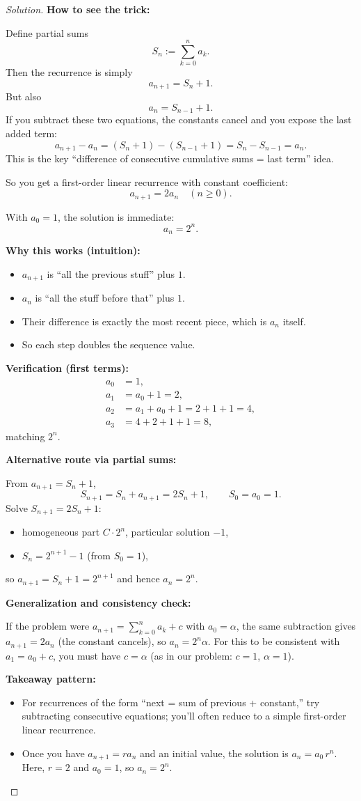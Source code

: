 \documentclass[12pt,a4paper]{article}
\theoremstyle{definition}
\theoremstyle{remark}
\newenvironment{solution}{\begin{proof}[Solution]}{\end{proof}}
\begin{document}
\begin{solution}
\textbf{How to see the trick:}

Define partial sums
$$S_n:=\sum_{k=0}^n a_k.$$
Then the recurrence is simply
$$a_{n+1}=S_n+1.$$
But also
$$a_n=S_{n-1}+1.$$
If you subtract these two equations, the constants cancel and you expose the last added term:
$$a_{n+1}-a_n=(S_n+1)-(S_{n-1}+1)=S_n-S_{n-1}=a_n.$$
This is the key ``difference of consecutive cumulative sums = last term'' idea.

So you get a first-order linear recurrence with constant coefficient:
$$a_{n+1}=2a_n \quad (n\ge 0).$$

With $a_0=1$, the solution is immediate:
$$a_n=2^n.$$

\textbf{Why this works (intuition):}
\begin{itemize}
    \item $a_{n+1}$ is ``all the previous stuff'' plus $1$.
    \item $a_n$ is ``all the stuff before that'' plus $1$.
    \item Their difference is exactly the most recent piece, which is $a_n$ itself.
    \item So each step doubles the sequence value.
\end{itemize}

\textbf{Verification (first terms):}
\begin{align}
a_0 &= 1,\\
a_1 &= a_0+1=2,\\
a_2 &= a_1+a_0+1=2+1+1=4,\\
a_3 &= 4+2+1+1=8,
\end{align}
matching $2^n$.

\textbf{Alternative route via partial sums:}

From $a_{n+1}=S_n+1$,
$$S_{n+1}=S_n+a_{n+1}=2S_n+1,\qquad S_0=a_0=1.$$
Solve $S_{n+1}=2S_n+1$:
\begin{itemize}
    \item homogeneous part $C\cdot 2^n$, particular solution $-1$,
    \item $S_n=2^{n+1}-1$ (from $S_0=1$),
\end{itemize}
so $a_{n+1}=S_n+1=2^{n+1}$ and hence $a_n=2^n$.

\textbf{Generalization and consistency check:}

If the problem were $a_{n+1}=\sum_{k=0}^n a_k + c$ with $a_0=\alpha$, the same subtraction gives $a_{n+1}=2a_n$ (the constant cancels), so $a_n=2^n\alpha$. For this to be consistent with $a_1=a_0+c$, you must have $c=\alpha$ (as in our problem: $c=1$, $\alpha=1$).

\textbf{Takeaway pattern:}
\begin{itemize}
    \item For recurrences of the form ``next = sum of previous + constant,'' try subtracting consecutive equations; you'll often reduce to a simple first-order linear recurrence.
    \item Once you have $a_{n+1}=r a_n$ and an initial value, the solution is $a_n=a_0\, r^n$. Here, $r=2$ and $a_0=1$, so $a_n=2^n$.
\end{itemize}
\end{solution}
\end{document}
